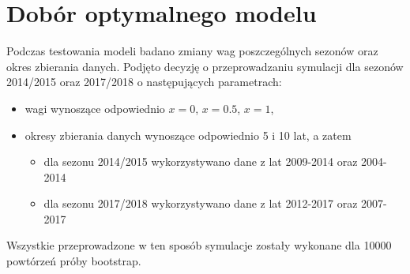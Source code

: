 \documentclass[inzynierska]{pwr_wmat_praca_dyplomowa}
\theoremstyle{plain}
\numberwithin{theorem}{chapter}
\theoremstyle{definition}
\numberwithin{theorem}{chapter}
\begin{document}
\section{Dobór optymalnego modelu}
Podczas testowania modeli badano zmiany wag poszczególnych sezonów oraz okres zbierania danych. Podjęto decyzję o przeprowadzaniu symulacji dla sezonów 2014/2015 oraz 2017/2018 o następujących parametrach:
\begin{itemize}
	\item wagi wynoszące odpowiednio $x=0$, $x=0.5$, $x=1$,
	\item okresy zbierania danych wynoszące odpowiednio 5 i 10 lat, a zatem
	\begin{itemize}
		\item dla sezonu 2014/2015 wykorzystywano dane z lat 2009-2014 oraz 2004-2014
		\item dla sezonu 2017/2018 wykorzystywano dane z lat 2012-2017 oraz 2007-2017
	\end{itemize}
\end{itemize}
Wszystkie przeprowadzone w ten sposób symulacje zostały wykonane dla 10000 powtórzeń próby bootstrap. 
\end{document}
